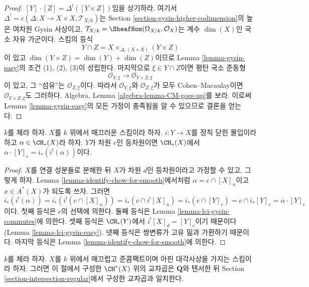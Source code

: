 \begin{proof}
$[Y] \cdot [Z] = \Delta^!([Y \times Z])$임을 상기하라. 여기서
$\Delta^! = c(\Delta : X \to X \times X, \mathcal{T}_{X/k})$는
Section \ref{section-gysin-higher-codimension}의 높은 여차원 Gysin
사상이고,
$\mathcal{T}_{X/k} = \SheafHom(\Omega_{X/k}, \mathcal{O}_X)$는
계수 $\dim(X)$인 국소 자유 가군이다. 스킴의 등식
$$
Y \cap Z = X \times_{\Delta, (X \times X)} (Y \times Z)
$$
이 있고 $\dim(Y \times Z) = \dim(Y) + \dim(Z)$이므로 Lemma
\ref{lemma-gysin-easy}의 조건 (1), (2), (3)이 성립한다.
마지막으로 $\xi \in Y \cap Z$이면 평탄 국소 준동형
$$
\mathcal{O}_{Y, \xi} \longrightarrow
\mathcal{O}_{Y \times Z, \xi}
$$
이 있고, 그 “섬유”는 $\mathcal{O}_{Z, \xi}$이다. 따라서
$\mathcal{O}_{Y, \xi}$와 $\mathcal{O}_{Z, \xi}$가 모두
Cohen--Macaulay이면 $\mathcal{O}_{Y \times Z, \xi}$도 그러하다.
Algebra, Lemma \ref{algebra-lemma-CM-goes-up}를 보라. 이로써 Lemma
\ref{lemma-gysin-easy}의 모든 가정이 충족됨을 알 수 있으므로
결론을 얻는다.
\end{proof}

\begin{lemma}
\label{lemma-intersect-regularly-embedded}
$k$를 체라 하자. $X$를 $k$ 위에서 매끄러운 스킴이라 하자.
$i : Y \to X$를 정칙 닫힌 몰입이라 하고 $\alpha \in \CH_*(X)$라 하자.
$Y$가 차원 $e$인 등차원이면
$\CH_*(X)$에서 $\alpha \cdot [Y]_e = i_*(i^!(\alpha))$이다.
\end{lemma}

\begin{proof}
$X$를 연결 성분들로 분해한 뒤 $X$가 차원 $d$인 등차원이라고
가정할 수 있고, 그렇게 하자. Lemma
\ref{lemma-identify-chow-for-smooth}에서처럼
$\alpha = c \cap [X]_n$이고 $x \in A^*(X)$가 되도록 쓰자. 그러면
$$
i_*(i^!(\alpha)) = i_*(i^!(c \cap [X]_n)) =
i_*(c \cap i^![X]_n) = i_*(c \cap [Y]_e) =
c \cap i_*[Y]_e = \alpha \cdot [Y]_e
$$
이다. 첫째 등식은 $c$의 선택에 의한다. 둘째 등식은 Lemma
\ref{lemma-lci-gysin-commutes}에 의한다. 셋째 등식은
$\CH_*(Y)$에서 $i^![X]_d = [Y]_e$이기 때문이다(Lemma
\ref{lemma-lci-gysin-easy}). 넷째 등식은 쌍변류가 고유 밂과
가환하기 때문이다. 마지막 등식은 Lemma
\ref{lemma-identify-chow-for-smooth}에 의한다.
\end{proof}

\begin{lemma}
\label{lemma-intersection-regular-smooth}
$k$를 체라 하자. $X$를 $k$ 위에서 매끄럽고 준콤팩트이며 아핀
대각사상을 가지는 스킴이라 하자. 그러면 이 절에서 구성한
$\CH^*(X)$ 위의 교차곱은 $\mathbf{Q}$와 텐서한 뒤 Section
\ref{section-intersection-regular}에서 구성한 교차곱과 일치한다.
\end{lemma}

